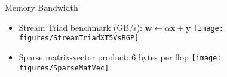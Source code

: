 \begin{frame}[shrink=1]{Memory Bandwidth}
\begin{itemize}
\item Stream Triad benchmark (GB/s): $\bm w \gets \alpha \bm x + \bm y$
\texttt{[image: figures/StreamTriadXT5VsBGP]} \\
\item Sparse matrix-vector product: 6 bytes per flop
\texttt{[image: figures/SparseMatVec]} \\
\end{itemize}
\end{frame}


